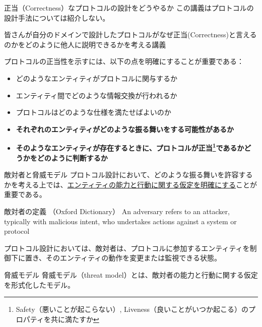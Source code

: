 \documentclass[aspectratio=169,10pt]{beamer}
\newenvironment{proofblock}[1][]
{\begin{block}{#1}\vspace{0.5em}}
{\vspace{0.5em}\end{block}}
\newenvironment{outlineblock}[1][]
{\begin{tcolorbox}[colframe=black, colback=white, boxrule=1pt, boxsep=5pt]}
{\end{tcolorbox}}
\begin{document}
\begin{frame}{正当（Correctness）なプロトコルの設計をどうやるか}
この講義はプロトコルの設計手法については紹介しない。

\begin{outlineblock}[]
    皆さんが自分のドメインで設計したプロトコルがなぜ正当(Correctness)と言えるのかをどのように他人に説明できるかを考える講義
\end{outlineblock}

プロトコルの正当性を示すには、以下の点を明確にすることが重要である：
\begin{itemize}
    \item どのようなエンティティがプロトコルに関与するか
    \item エンティティ間でどのような情報交換が行われるか
    \item プロトコルはどのような仕様を満たせばよいのか
    \item \textbf{それぞれのエンティティがどのような振る舞いをする可能性があるか}
    \item \textbf{そのようなエンティティが存在するときに、プロトコルが正当\footnote{Safety（悪いことが起こらない）, Liveness（良いことがいつか起こる）のプロパティを共に満たすか}であるかどうかをどのように判断するか}
\end{itemize}

\end{frame}


\begin{frame}{敵対者と脅威モデル}
プロトコル設計において、どのような振る舞いを許容するかを考える上では、\underline{エンティティの能力と行動に関する仮定を明確にする}ことが重要である。

\begin{proofblock}[敵対者の定義 （Oxford Dictionary）]
An adversary refers to an attacker, typically with malicious intent, who undertakes actions against a system or protocol
\end{proofblock}
プロトコル設計においては、敵対者は、プロトコルに参加するエンティティを制御下に置き、そのエンティティの動作を変更または監視できる状態。

\vspace{0.5em}
\begin{proofblock}[脅威モデル]
脅威モデル（threat model）とは、敵対者の能力と行動に関する仮定を形式化したモデル。
\end{proofblock}

\end{frame}
\end{document}
